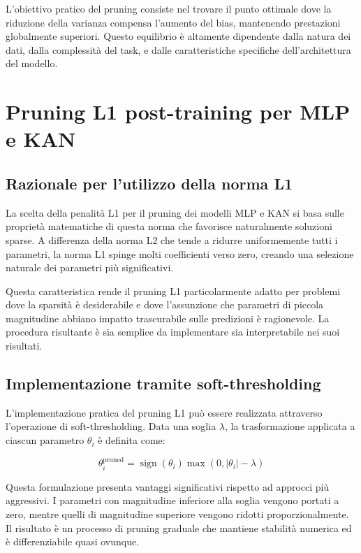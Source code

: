 \documentclass[a4paper,12pt]{report}
\begin{document}
	L'obiettivo pratico del pruning consiste nel trovare il punto ottimale dove la riduzione della varianza compensa l'aumento del bias, mantenendo prestazioni globalmente superiori. Questo equilibrio è altamente dipendente dalla natura dei dati, dalla complessità del task, e dalle caratteristiche specifiche dell'architettura del modello.
	
	\section{Pruning L1 post-training per MLP e KAN}
	
	\subsection{Razionale per l'utilizzo della norma L1}
	La scelta della penalità L1 per il pruning dei modelli MLP e KAN si basa sulle proprietà matematiche di questa norma che favorisce naturalmente soluzioni sparse. A differenza della norma L2 che tende a ridurre uniformemente tutti i parametri, la norma L1 spinge molti coefficienti verso zero, creando una selezione naturale dei parametri più significativi.
	
	Questa caratteristica rende il pruning L1 particolarmente adatto per problemi dove la sparsità è desiderabile e dove l'assunzione che parametri di piccola magnitudine abbiano impatto trascurabile sulle predizioni è ragionevole. La procedura risultante è sia semplice da implementare sia interpretabile nei suoi risultati.
	
	\subsection{Implementazione tramite soft-thresholding}
	L'implementazione pratica del pruning L1 può essere realizzata attraverso l'operazione di soft-thresholding. Data una soglia $\lambda$, la trasformazione applicata a ciascun parametro $\theta_i$ è definita come:
	
	\[
	\theta_i^{\text{pruned}} = \operatorname{sign}(\theta_i) \max(0, |\theta_i| - \lambda)
	\]
	
	Questa formulazione presenta vantaggi significativi rispetto ad approcci più aggressivi. I parametri con magnitudine inferiore alla soglia vengono portati a zero, mentre quelli di magnitudine superiore vengono ridotti proporzionalmente. Il risultato è un processo di pruning graduale che mantiene stabilità numerica ed è differenziabile quasi ovunque.
	
\end{document}
